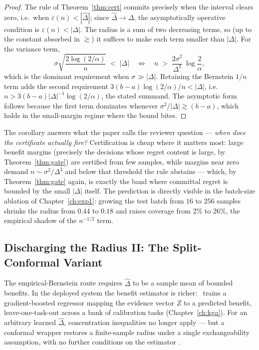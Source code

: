 \begin{proof}
The rule of Theorem~\ref{thm:cert} commits precisely when the interval clears zero,
i.e.\ when $\varepsilon(n)<|\widehat\Delta|$; since $\widehat\Delta\to\Delta$, the
asymptotically operative condition is $\varepsilon(n)<|\Delta|$. The radius is a sum of
two decreasing terms, so (up to the constant absorbed in $\gtrsim$) it suffices to make
each term smaller than $|\Delta|$. For the variance term,
\[
\sigma\sqrt{\frac{2\log(2/\alpha)}{n}}\;<\;|\Delta|
\quad\Longleftrightarrow\quad
n\;>\;\frac{2\sigma^2}{\Delta^2}\,\log\frac{2}{\alpha},
\]
which is the dominant requirement when $\sigma\gg|\Delta|$. Retaining the Bernstein
$1/n$ term adds the second requirement
$3(b-a)\log(2/\alpha)/n<|\Delta|$, i.e.\ $n>3(b-a)|\Delta|^{-1}\log(2/\alpha)$, the
stated summand. The asymptotic form follows because the first term dominates whenever
$\sigma^2/|\Delta|\gtrsim(b-a)$, which holds in the small-margin regime where the bound
bites. \qedhere
\end{proof}

The corollary answers what the paper calls the reviewer question --- \emph{when does
the certificate actually fire?} Certification is cheap where it matters most: large
benefit margins (precisely the decisions whose regret content is large, by
Theorem~\ref{thm:gate}) are certified from few samples, while margins near zero demand
$n\sim\sigma^2/\Delta^2$ and below that threshold the rule abstains --- which, by
Theorem~\ref{thm:gate} again, is exactly the band where committal regret is bounded by
the small $|\Delta|$ itself. The prediction is directly visible in the batch-size
ablation of Chapter~\ref{ch:exp1}: growing the test batch from $16$ to $256$ samples
shrinks the radius from $0.44$ to $0.18$ and raises coverage from $2\%$ to $26\%$,
the empirical shadow of the $n^{-1/2}$ term.

\subsection{Discharging the Radius II: The Split-Conformal Variant}
\label{sec:t2-conformal}

The empirical-Bernstein route requires $\widehat\Delta$ to be a sample mean of bounded
benefits. In the deployed system the benefit estimator is richer: \KGA\ trains a
gradient-boosted regressor mapping the evidence vector $Z$ to a predicted benefit,
leave-one-task-out across a bank of calibration tasks (Chapter~\ref{ch:kga}). For an
arbitrary learned $\widehat\Delta$, concentration inequalities no longer apply --- but
a conformal wrapper restores a finite-sample radius under a single exchangeability
assumption, with no further conditions on the estimator
\cite{vovk2005algorithmic,angelopoulos2023conformal}.

